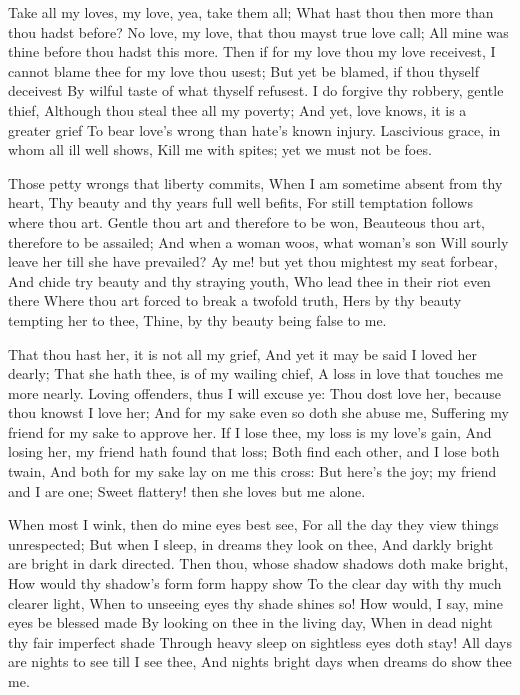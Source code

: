 \documentclass[twocolumn]{book}
\begin{document}
Take all my loves, my love, yea, take them all;
What hast thou then more than thou hadst before?
No love, my love, that thou mayst true love call;
All mine was thine before thou hadst this more.
\numerus*{}Then if for my love thou my love receivest,
I cannot blame thee for my love thou usest;
But yet be blamed, if thou thyself deceivest
By wilful taste of what thyself refusest.
I do forgive thy robbery, gentle thief,
Although thou steal thee all my poverty;
And yet, love knows, it is a greater grief
To bear love's wrong than hate's known injury.
  Lascivious grace, in whom all ill well shows,
  Kill me with spites; yet we must not be foes.


Those petty wrongs that liberty commits,
When I am sometime absent from thy heart,
Thy beauty and thy years full well befits,
For still temptation follows where thou art.
Gentle thou art and therefore to be won,
Beauteous thou art, therefore to be assailed;
And when a woman woos, what woman's son
Will sourly leave her till she have prevailed?
Ay me! but yet thou mightest my seat forbear,
And chide try beauty and thy straying youth,
Who lead thee in their riot even there
Where thou art forced to break a twofold truth,
  Hers by thy beauty tempting her to thee,
  Thine, by thy beauty being false to me.


That thou hast her, it is not all my grief,
And yet it may be said I loved her dearly;
That she hath thee, is of my wailing chief,
A loss in love that touches me more nearly.
Loving offenders, thus I will excuse ye:
Thou dost love her, because thou knowst I love her;
And for my sake even so doth she abuse me,
Suffering my friend for my sake to approve her.
If I lose thee, my loss is my love's gain,
And losing her, my friend hath found that loss;
Both find each other, and I lose both twain,
And both for my sake lay on me this cross:
  But here's the joy; my friend and I are one;
  Sweet flattery! then she loves but me alone.


When most I wink, then do mine eyes best see,
For all the day they view things unrespected;
But when I sleep, in dreams they look on thee,
And darkly bright are bright in dark directed.
Then thou, whose shadow shadows doth make bright,
How would thy shadow's form form happy show
To the clear day with thy much clearer light,
When to unseeing eyes thy shade shines so!
How would, I say, mine eyes be blessed made
By looking on thee in the living day,
When in dead night thy fair imperfect shade
Through heavy sleep on sightless eyes doth stay!
  All days are nights to see till I see thee,
  And nights bright days when dreams do show thee me.
\end{document}
